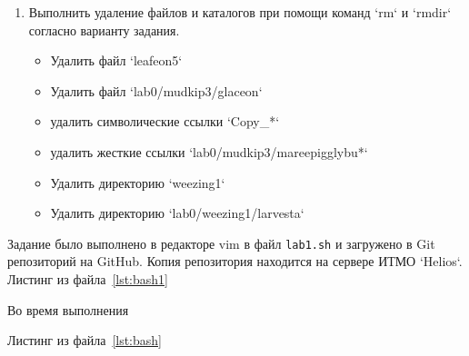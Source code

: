 \begin{enumerate}
        \item Выполнить удаление файлов и каталогов при помощи команд `rm` и `rmdir` согласно варианту задания.
        \begin{itemize}
            \item Удалить файл `leafeon5`
            \item Удалить файл `lab0/mudkip3/glaceon`
            \item удалить символические ссылки `Copy\_*`
            \item удалить жесткие ссылки `lab0/mudkip3/mareepigglybu*`
            \item Удалить директорию `weezing1`
            \item Удалить директорию `lab0/weezing1/larvesta`
        \end{itemize}
    \end{enumerate}



    \newpage
    Задание было выполнено в редакторе vim в файл \verb|lab1.sh| и загружено в Git репозиторий на GitHub. Копия репозитория находится на сервере ИТМО `Helios`.
    Листинг из файла~\ref{lst:bash1}
    

    Во время выполнения 

    Листинг из файла~\ref{lst:bash}
    





